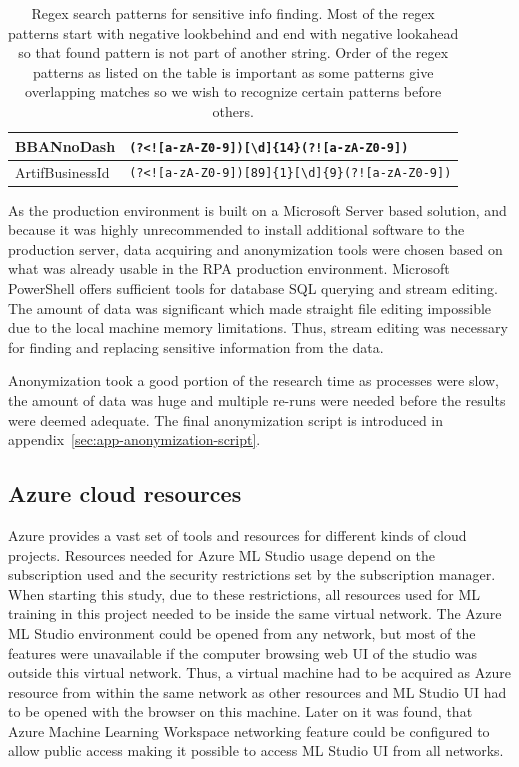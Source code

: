 \begin{table}[]
\begin{tabularx}{\textwidth}{|L{0.18\textwidth}|Y|}
        BBANnoDash &
        \verb=(?<![a-zA-Z0-9])[\d]{14}(?![a-zA-Z0-9])=
        \\ \hline
        ArtifBusinessId &
        \verb=(?<![a-zA-Z0-9])[89]{1}[\d]{9}(?![a-zA-Z0-9])=
        \\ \hline
    \end{tabularx}
    \caption{Regex search patterns for sensitive info finding.
    Most of the regex patterns start with negative lookbehind
    and end with negative lookahead
    so that found pattern is not part of another string.
    Order of the regex patterns as listed on the table is important
    as some patterns give overlapping matches
    so we wish to recognize certain patterns before others.}
    \label{tab:regex-sensitive-regex}
\end{table}

As the production environment is built on a Microsoft Server based solution,
and because it was highly unrecommended
to install additional software to the production server,
data acquiring and anonymization tools were chosen
based on what was already usable in the RPA production environment.
Microsoft PowerShell offers sufficient tools
for database SQL querying
and stream editing.
The amount of data was significant
which made straight file editing impossible
due to the local machine memory limitations.
Thus, stream editing was necessary
for finding and replacing
sensitive information from the data.

Anonymization took a good portion of the research time
as processes were slow,
the amount of data was huge
and multiple re-runs were needed
before the results were deemed adequate.
The final anonymization script
is introduced in appendix~\ref{sec:app-anonymization-script}.


\subsection{Azure cloud resources}\label{subsec:meth-azure-cloud resources}

Azure provides a vast set of tools and resources
for different kinds of cloud projects.
Resources needed for Azure ML Studio usage
depend on the subscription used
and the security restrictions set by the subscription manager.
When starting this study,
due to these restrictions,
all resources used for ML training in this project
needed to be inside the same virtual network.
The Azure ML Studio environment could be opened from any network,
but most of the features were unavailable
if the computer browsing web UI of the studio was outside this virtual network.
Thus,
a virtual machine had to be acquired as Azure resource
from within the same network as other resources
and ML Studio UI had to be opened with the browser on this machine.
Later on it was found,
that Azure Machine Learning Workspace networking feature
could be configured to allow public access
making it possible to access ML Studio UI from all networks.


